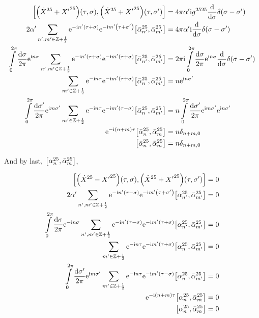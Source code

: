 \begin{align*}
    \comm{\qty({\dot X}^{25}+{X'}^{25})\qty(\tau,\sigma)}{\qty({\dot X}^{25}+{X'}^{25})\qty(\tau,\sigma')}&=4\pi\alpha'\im g^{2525}\dv{}{\sigma}\delta\qty(\sigma-\sigma')\\
    2\alpha'\sum\limits_{n',m'\in\mathbb Z+\frac12}\e^{-\im n'\qty(\tau+\sigma)}\e^{-\im m'\qty(\tau+\sigma')}\comm{{\bar\alpha}^{25}_{n'}}{{\bar\alpha}^{25}_{m'}}&=4\pi\alpha'\im \dv{}{\sigma}\delta\qty(\sigma-\sigma')\\
    \int\limits_0^{2\pi}\frac{\dd{\sigma}}{2\pi}\e^{\im n\sigma}\sum\limits_{n',m'\in\mathbb Z+\frac12}\e^{-\im n'\qty(\tau+\sigma)}\e^{-\im m'\qty(\tau+\sigma)}\comm{{\bar\alpha}^{25}_{n'}}{{\bar\alpha}^{25}_{m'}}&=2\pi\im \int\limits_0^{2\pi}\frac{\dd{\sigma}}{2\pi}\e^{\im n\sigma}\dv{}{\sigma}\delta\qty(\sigma-\sigma')\\
    \sum\limits_{m'\in\mathbb Z+\frac12}\e^{-\im n\tau}\e^{-\im m'\qty(\tau+\sigma)}\comm{{\bar\alpha}^{25}_{n}}{{\bar\alpha}^{25}_{m'}}&= n\e^{\im n\sigma'}\\
    \int\limits_0^{2\pi}\frac{\dd{\sigma'}}{2\pi}\e^{\im m\sigma'}\sum\limits_{m'\in\mathbb Z+\frac12}\e^{-\im n\tau}\e^{-\im m'\qty(\tau-\sigma)}\comm{{\bar\alpha}^{25}_{n}}{{\bar\alpha}^{25}_{m'}}&=n\int\limits_0^{2\pi}\frac{\dd{\sigma'}}{2\pi}\e^{\im m\sigma'}\e^{\im n\sigma'}\\
    \e^{-\im \qty(n+m)\tau}\comm{{\bar\alpha}^{25}_{n}}{{\bar\alpha}^{25}_{m}}&=n\delta_{n+m,0}\\
    \comm{{\bar\alpha}^{25}_{n}}{{\bar\alpha}^{25}_{m}}&=n\delta_{n+m,0}
\end{align*}

And by last, $\comm{\alpha^{25}_n}{{\bar\alpha}^{25}_m}$,

\begin{align*}
    \comm{\qty({\dot X}^{25}-{X'}^{25})\qty(\tau,\sigma)}{\qty({\dot X}^{25}+{X'}^{25})\qty(\tau,\sigma')}&=0\\
    2\alpha'\sum\limits_{n',m'\in\mathbb Z+\frac12}\e^{-\im n'\qty(\tau-\sigma)}\e^{-\im m'\qty(\tau+\sigma')}\comm{{\alpha}^{25}_{n'}}{{\bar\alpha}^{25}_{m'}}&=0\\
    \int\limits_0^{2\pi}\frac{\dd{\sigma}}{2\pi}\e^{-\im n\sigma}\sum\limits_{n',m'\in\mathbb Z+\frac12}\e^{-\im n'\qty(\tau-\sigma)}\e^{-\im m'\qty(\tau+\sigma)}\comm{{\alpha}^{25}_{n'}}{{\bar\alpha}^{25}_{m'}}&=0\\
    \sum\limits_{m'\in\mathbb Z+\frac12}\e^{-\im n\tau}\e^{-\im m'\qty(\tau+\sigma)}\comm{{\alpha}^{25}_{n}}{{\bar\alpha}^{25}_{m'}}&=0\\
    \int\limits_0^{2\pi}\frac{\dd{\sigma'}}{2\pi}\e^{\im m\sigma'}\sum\limits_{m'\in\mathbb Z+\frac12}\e^{-\im n\tau}\e^{-\im m'\qty(\tau-\sigma)}\comm{{\alpha}^{25}_{n}}{{\bar\alpha}^{25}_{m'}}&=0\\
    \e^{-\im \qty(n+m)\tau}\comm{{\alpha}^{25}_{n}}{{\bar\alpha}^{25}_{m}}&=0\\
    \comm{{\alpha}^{25}_{n}}{{\bar\alpha}^{25}_{m}}&=0
\end{align*}

